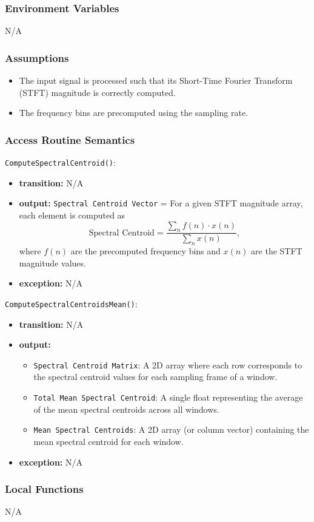 \documentclass[12pt, titlepage]{article}
\begin{document}
{\subsubsection{Environment Variables}
N/A

\subsubsection{Assumptions}
\begin{itemize}
    \item The input signal is processed such that its Short-Time Fourier Transform (STFT) magnitude is correctly computed.
    \item The frequency bins are precomputed using the sampling rate.
\end{itemize}

\subsubsection{Access Routine Semantics}

\noindent \texttt{ComputeSpectralCentroid()}:
\begin{itemize}
    \item \textbf{transition:} N/A
    \item \textbf{output:} \texttt{Spectral Centroid Vector} = For a given STFT magnitude array, each element is computed as 
    \[
    \text{Spectral Centroid} = \frac{\sum_{n} f(n) \cdot x(n)}{\sum_{n} x(n)},
    \]
    where \(f(n)\) are the precomputed frequency bins and \(x(n)\) are the STFT magnitude values.
    \item \textbf{exception:} N/A
\end{itemize}

\noindent \texttt{ComputeSpectralCentroidsMean()}:
\begin{itemize}
    \item \textbf{transition:} N/A
    \item \textbf{output:} 
    \begin{itemize}
        \item \texttt{Spectral Centroid Matrix}: A 2D array where each row corresponds to the spectral centroid values for each sampling frame of a window.
        \item \texttt{Total Mean Spectral Centroid}: A single float representing the average of the mean spectral centroids across all windows.
        \item \texttt{Mean Spectral Centroids}: A 2D array (or column vector) containing the mean spectral centroid for each window.
    \end{itemize}
    \item \textbf{exception:} N/A
\end{itemize}

\subsubsection{Local Functions}
N/A
}
\end{document}
